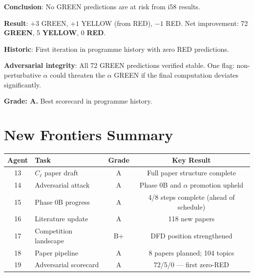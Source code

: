 \documentclass[11pt,a4paper]{article}
\newcommand{\GREEN}{\textcolor{dfdgreen}{\textbf{GREEN}}}
\newcommand{\YELLOW}{\textcolor{dfdyellow}{\textbf{YELLOW}}}
\newcommand{\RED}{\textcolor{dfdred}{\textbf{RED}}}
\begin{document}
\textbf{Conclusion}: No GREEN predictions are at risk from i58 results.

\begin{tcolorbox}[colback=green!5!white, colframe=green!60!black, title={Agent 19: Scorecard --- 72/5/0 (FIRST ZERO-RED SCORECARD)}]
\textbf{Result}: $+3$ GREEN, $+1$ YELLOW (from RED), $-1$ RED. Net improvement: 72 \GREEN, 5 \YELLOW, 0 \RED.

\textbf{Historic}: First iteration in programme history with zero RED predictions.

\textbf{Adversarial integrity}: All 72 GREEN predictions verified stable. One flag: non-perturbative $\alpha$ could threaten the $\alpha$ GREEN if the final computation deviates significantly.

\textbf{Grade: A.} Best scorecard in programme history.
\end{tcolorbox}


\section*{New Frontiers Summary}

\begin{center}
\begin{tabular}{clcc}
\toprule
\textbf{Agent} & \textbf{Task} & \textbf{Grade} & \textbf{Key Result} \\
\midrule
13 & $C_\ell$ paper draft & A & Full paper structure complete \\
14 & Adversarial attack & A & Phase 0B and $\alpha$ promotion upheld \\
15 & Phase 0B progress & A & 4/8 steps complete (ahead of schedule) \\
16 & Literature update & A & 118 new papers \\
17 & Competition landscape & B+ & DFD position strengthened \\
18 & Paper pipeline & A & 8 papers planned; 104 topics \\
19 & Adversarial scorecard & A & 72/5/0 --- first zero-RED \\
\bottomrule
\end{tabular}
\end{center}
\end{document}
